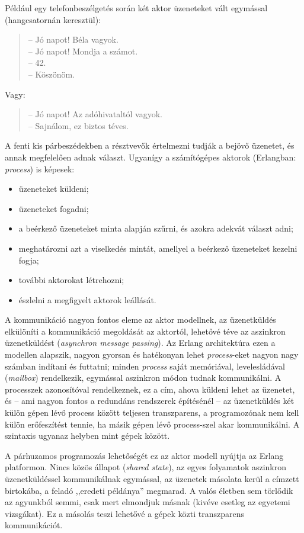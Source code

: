 \documentclass[12pt, a4paper, oneside]{book}
\begin{document}
Például egy telefonbeszélgetés során két aktor üzeneteket vált egymással
(hangcsatornán keresztül):

\begin{quote}
-- Jó napot! Béla vagyok.\\
-- Jó napot! Mondja a számot.\\
-- 42.\\
-- Köszönöm.
\end{quote}
\par\noindent Vagy:
\begin{quote}
-- Jó napot! Az adóhivataltól vagyok.\\
-- Sajnálom, ez biztos téves.
\end{quote}
\noindent A fenti kis párbeszédekben a résztvevők értelmezni tudják a bejövő
üzenetet, és annak megfelelően adnak választ. Ugyanígy a számítógépes 
aktorok (Erlangban: \emph{process}) is képesek:
\begin{itemize}
  \item üzeneteket küldeni;
  \item üzeneteket fogadni;
  \item a beérkező üzeneteket minta alapján szűrni, és azokra adekvát választ
adni;
  \item meghatározni azt a viselkedés mintát, amellyel a beérkező üzeneteket
kezelni fogja;
  \item további aktorokat létrehozni;
  \item észlelni a megfigyelt aktorok leállását. 
\end{itemize}

A kommunikáció nagyon fontos eleme az aktor modellnek, az üzenetküldés
elkülöníti a kommunikáció megoldását az aktortól, lehetővé téve az aszinkron
üzenetküldést (\emph{asynchron message passing}). Az Erlang architektúra ezen a
modellen alapszik, nagyon gyorsan és hatékonyan lehet \emph{process}-eket
nagyon nagy számban indítani és futtatni; minden \emph{process} saját
memóriával, levelesládával (\emph{mailbox}) rendelkezik, egymással aszinkron
módon tudnak kommunikálni. A processzek azonosítóval rendelkeznek, ez a cím,
ahova küldeni lehet az üzenetet, és -- ami nagyon fontos a redundáns rendszerek
építésénél -- az üzenetküldés két külön gépen lévő process között teljesen
transzparens, a programozónak nem kell külön erőfeszítést tennie, ha másik
gépen lévő process-szel akar kommunikálni. A szintaxis ugyanaz helyben mint gépek
között.

A párhuzamos programozás lehetőségét ez az aktor modell nyújtja az Erlang
platformon. Nincs közös állapot (\emph{shared state}), az egyes folyamatok
aszinkron üzenetküldéssel kommunikálnak egymással, az üzenetek másolata kerül a
címzett birtokába, a feladó ,,eredeti példánya'' megmarad. A valós életben sem
törlődik az agyunkból semmi, csak mert elmondjuk másnak (kivéve esetleg az
egyetemi vizsgákat). Ez a másolás teszi lehetővé a gépek közti transzparens
kommunikációt.
\end{document}
